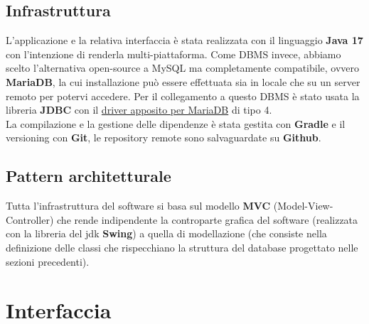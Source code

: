 \documentclass[a4paper,12pt]{report}
\begin{document}
\subsection{Infrastruttura}
L'applicazione e la relativa interfaccia è stata realizzata con il linguaggio \textbf{Java 17} con l'intenzione di renderla multi-piattaforma. Come DBMS invece, abbiamo scelto l'alternativa open-source a MySQL ma completamente compatibile, ovvero \textbf{MariaDB}, la cui installazione può essere effettuata sia in locale che su un server remoto per potervi accedere. Per il collegamento a questo DBMS è stato usata la libreria \textbf{JDBC} con il \href{https://mvnrepository.com/artifact/org.mariadb.jdbc/mariadb-java-client}{driver apposito per MariaDB} di tipo 4.\\
La compilazione e la gestione delle dipendenze è stata gestita con \textbf{Gradle} e il versioning con \textbf{Git}, le repository remote sono salvaguardate su \textbf{Github}.
\subsection{Pattern architetturale}
Tutta l'infrastruttura del software si basa sul modello \textbf{MVC} (Model-View-Controller) che rende indipendente la controparte grafica del software (realizzata con la libreria del jdk \textbf{Swing}) a quella di modellazione (che consiste nella definizione delle classi che rispecchiano la struttura del database progettato nelle sezioni precedenti).

\section{Interfaccia}
\end{document}
